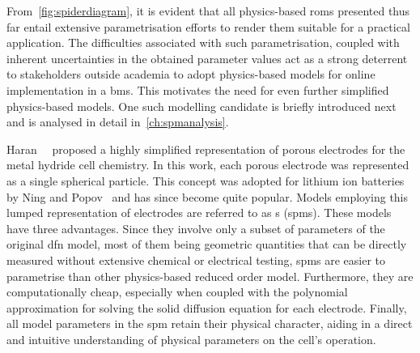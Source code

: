 From~\cref{fig:spiderdiagram}, it is evident  that all physics-based \glspl{rom}
presented thus far entail extensive  parametrisation efforts   to  render
them  suitable for  a practical  application. The  difficulties associated  with
such  parametrisation,  coupled  with  inherent uncertainties  in  the  obtained
parameter values act  as a strong deterrent to stakeholders  outside academia to
adopt  physics-based  models for  online  implementation  in a  \gls{bms}.  This
motivates the  need for even  further simplified physics-based models.  One such
modelling  candidate  is briefly  introduced  next  and  is analysed  in  detail
in~\cref{ch:spmanalysis}.


Haran~\etal{}~\cite{Haran1998}  proposed a  highly simplified  representation of
porous  electrodes for  the metal  hydride cell  chemistry. In  this work,  each
porous electrode  was represented as  a single spherical particle.  This concept
was adopted for lithium ion batteries  by Ning and Popov~\cite{Ning2004} and has
since  become quite  popular.  Models employing  this  lumped representation  of
electrodes are referred to as  s (\gls{spm}s). These models have
three advantages. Since they involve only a subset of parameters of the original
\gls{dfn} model,  most of them being  geometric quantities that can  be directly
measured  without  extensive chemical  or  electrical  testing, \glspl{spm}  are
easier to parametrise than other physics-based reduced order model. Furthermore,
they  are computationally  cheap, especially  when coupled  with the  polynomial
approximation  for solving  the  solid diffusion  equation  for each  electrode.
Finally, all model parameters in  the \gls{spm} retain their physical character,
aiding in  a direct and  intuitive understanding  of physical parameters  on the
cell's operation.

